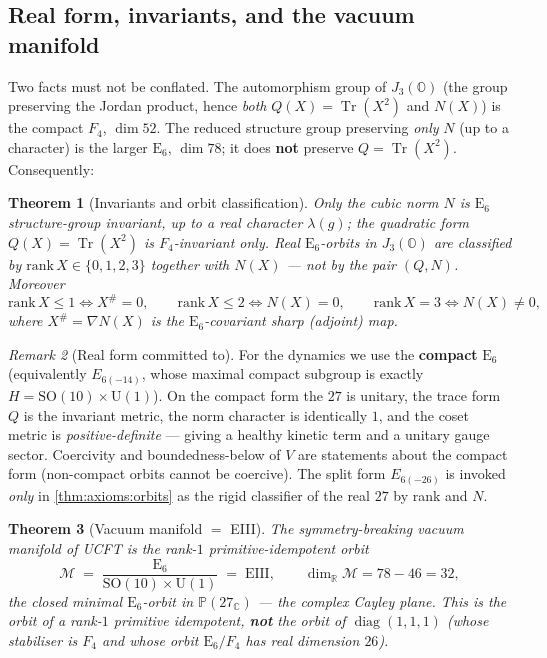 \documentclass[11pt]{article}
\theoremstyle{plain}
\newtheorem{theorem}{Theorem}[section]
\theoremstyle{definition}
\theoremstyle{remark}
\newtheorem{remark}[theorem]{Remark}
\newcommand{\SO}[1]{\mathrm{SO}(#1)}
\newcommand{\U}[1]{\mathrm{U}(#1)}
\newcommand{\E}[1]{\mathrm{E}_{#1}}
\newcommand{\diag}{\operatorname{diag}}
\newcommand{\Tr}{\operatorname{Tr}}
\newcommand{\M}{\mathcal{M}}
\newcommand{\jalg}{J_3(\mathbb{O})}
\newcommand{\SOTen}{\SO{10}}
\newcommand{\UOne}{\U{1}}
\newcommand{\ESix}{\E{6}}
\begin{document}
\subsection{Real form, invariants, and the vacuum manifold}
\label{sec:axioms:realform}

Two facts must not be conflated. The automorphism group of $\jalg$ (the group
preserving the Jordan product, hence \emph{both} $Q(X)=\Tr(X^2)$ and $N(X)$)
is the compact $F_4$, $\dim 52$. The reduced structure group preserving
\emph{only} $N$ (up to a character) is the larger $\ESix$, $\dim 78$; it does
\textbf{not} preserve $Q=\Tr(X^2)$. Consequently:

\begin{theorem}[Invariants and orbit classification]\label{thm:axioms:orbits}
Only the cubic norm $N$ is $\ESix$ structure-group invariant, up to a real
character $\lambda(g)$; the quadratic form $Q(X)=\Tr(X^2)$ is
$F_4$-invariant only. Real $\ESix$-orbits in $\jalg$ are classified by
$\mathrm{rank}\,X\in\{0,1,2,3\}$ together with $N(X)$ ---
\emph{not} by the pair $(Q,N)$. Moreover
\[
  \mathrm{rank}\,X\le1\iff X^{\#}=0,\qquad
  \mathrm{rank}\,X\le2\iff N(X)=0,\qquad
  \mathrm{rank}\,X=3\iff N(X)\neq0,
\]
where $X^{\#}=\nabla N(X)$ is the $\ESix$-covariant sharp (adjoint) map.
\end{theorem}

\begin{remark}[Real form committed to]\label{rem:axioms:compact}
For the dynamics we use the \textbf{compact} $\ESix$ (equivalently
$E_{6(-14)}$, whose maximal compact subgroup is exactly
$H=\SOTen\times\UOne$). On the compact form the $27$ is unitary, the trace
form $Q$ is the invariant metric, the norm character is identically $1$, and
the coset metric is \emph{positive-definite} --- giving a healthy kinetic
term and a unitary gauge sector. Coercivity and boundedness-below of $V$ are
statements about the compact form (non-compact orbits cannot be coercive).
The split form $E_{6(-26)}$ is invoked \emph{only} in
\autoref{thm:axioms:orbits} as the rigid classifier of the real $27$ by rank
and $N$.
\end{remark}

\begin{theorem}[Vacuum manifold $=$ EIII]\label{thm:axioms:eiii}
The symmetry-breaking vacuum manifold of UCFT is the rank-$1$
primitive-idempotent orbit
\begin{equation}\label{eq:axioms:eiii}
  \M \;=\; \frac{\ESix}{\SOTen\times\UOne} \;=\; \mathrm{EIII},
  \qquad \dim_{\mathbb R}\M = 78-46 = 32,
\end{equation}
the closed minimal $\ESix$-orbit in $\mathbb P(27_{\mathbb C})$ --- the
complex Cayley plane. This is the orbit of a rank-$1$ primitive idempotent,
\textbf{not} the orbit of $\diag(1,1,1)$ (whose stabiliser is $F_4$ and whose
orbit $\ESix/F_4$ has real dimension $26$).
\end{theorem}
\end{document}
